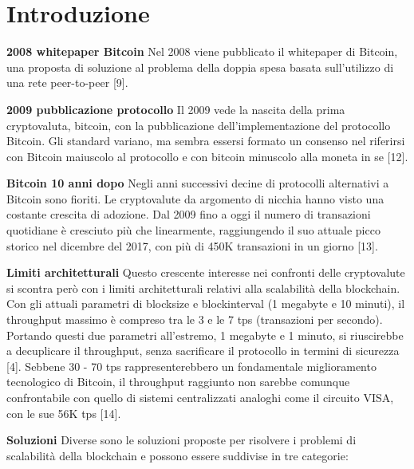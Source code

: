 \documentclass[12pt,italian,]{book}
\begin{document}
{
\setcounter{tocdepth}{2}
\tableofcontents
}

\listoftables
{}
\listoffigures


\hypertarget{introduzione}{%
\chapter{Introduzione}\label{introduzione}}

\textbf{2008 whitepaper Bitcoin} Nel 2008 viene pubblicato il whitepaper di Bitcoin, una proposta di soluzione al problema della doppia spesa basata sull'utilizzo di una rete peer-to-peer {[}9{]}.

\textbf{\textbf{2009 pubblicazione protocollo}} Il 2009 vede la nascita della prima cryptovaluta, bitcoin, con la pubblicazione
dell'implementazione del protocollo Bitcoin. Gli standard variano, ma sembra
essersi formato un consenso nel riferirsi con Bitcoin maiuscolo al
protocollo e con bitcoin minuscolo alla moneta in se {[}12{]}.

\textbf{\textbf{Bitcoin 10 anni dopo}} Negli anni successivi decine di protocolli alternativi a Bitcoin sono fioriti. Le cryptovalute da argomento di nicchia hanno visto una costante crescita di adozione. Dal 2009 fino a oggi il numero di transazioni quotidiane è cresciuto più che linearmente, raggiungendo il suo attuale picco storico nel dicembre del 2017, con più di 450K transazioni in un giorno {[}13{]}.

\textbf{\textbf{Limiti architetturali}} Questo crescente interesse nei confronti delle cryptovalute si scontra però con i limiti architetturali relativi alla scalabilità della blockchain. Con gli attuali parametri di blocksize e blockinterval (1 megabyte e 10 minuti), il throughput massimo è compreso tra le 3 e le 7 tps (transazioni per secondo). Portando questi due parametri all'estremo, 1 megabyte e 1 minuto, si riuscirebbe a decuplicare il throughput, senza sacrificare il protocollo in termini di sicurezza {[}4{]}. Sebbene 30 - 70 tps rappresenterebbero un fondamentale miglioramento tecnologico di Bitcoin, il throughput raggiunto non sarebbe comunque confrontabile con quello di sistemi centralizzati analoghi come il circuito VISA, con le sue 56K tps {[}14{]}.

\textbf{\textbf{Soluzioni}} Diverse sono le soluzioni proposte per risolvere i problemi di scalabilità della blockchain e possono essere suddivise in tre categorie:
\end{document}
